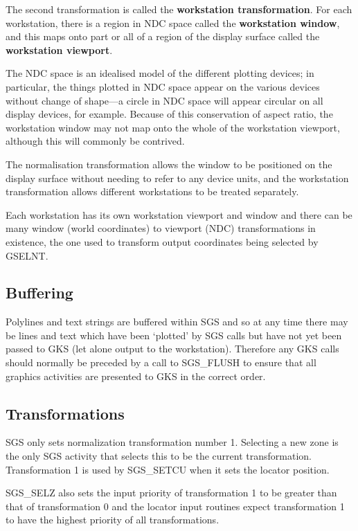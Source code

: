 The second transformation is called the {\bf workstation
transformation}.  For each workstation, there
is a region in NDC space called the {\bf workstation
window}, and this maps onto part or
all of a region of the
display surface called the {\bf workstation viewport}.

The NDC space is an idealised model of the different
plotting devices;  in particular, the things plotted
in NDC space appear on the various devices without
change of shape---a circle in NDC space will appear
circular on all display devices, for example.  Because of this
conservation of aspect ratio, the workstation window
may not map onto the whole of the workstation
viewport, although this will commonly
be contrived.

The normalisation transformation allows
the window to be positioned
on the display surface without needing to refer to any
device units, and the workstation transformation
allows different workstations
to be treated separately.

Each workstation has its own workstation viewport and window and there can
be many window (world coordinates) to viewport (NDC)
transformations in existence, 
the one used to transform output coordinates being selected by GSELNT.

\subsection* {Buffering}

Polylines and text strings are buffered within SGS and so at any time there
may be lines and text which have been `plotted' by SGS calls but have not yet
been passed to GKS (let alone output to the workstation).
Therefore any GKS calls should normally be preceded by a call to SGS\_FLUSH to
ensure that all graphics activities are presented to GKS  in the correct order.

\subsection* {Transformations}

SGS only sets normalization transformation number 1.
Selecting a new zone is the only SGS activity that selects this to be the
current transformation.
Transformation 1 is used by SGS\_SETCU when it sets the locator position.

SGS\_SELZ also sets the input priority of transformation 1 to be greater than
that of transformation 0 and the locator input routines expect transformation
1 to have the highest priority of all transformations.

